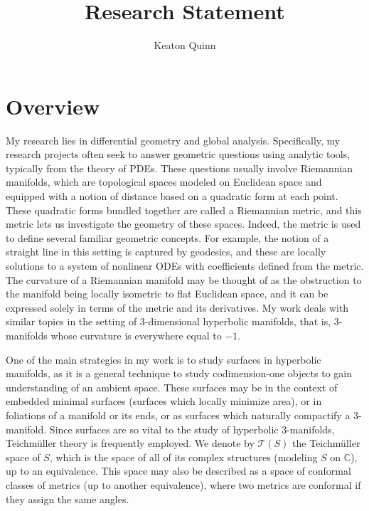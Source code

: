 \documentclass[11pt]{amsart}
\newcommand{\C}{\mathbb{C}}
\begin{document}
\title{Research Statement}

\author{Keaton Quinn}


\maketitle

\vspace{-0.2in}

\section{Overview}

My research lies in differential geometry and global analysis. 
Specifically, my research projects often seek to answer geometric questions using analytic tools, typically from the theory of PDEs. 
These questions usually involve Riemannian manifolds, which are topological spaces modeled on Euclidean space and equipped with a notion of distance based on a quadratic form at each point. 
These quadratic forms bundled together are called a Riemannian metric, and this metric lets us investigate the geometry of these spaces.  
Indeed, the metric is used to define several familiar geometric concepts. 
For example, the notion of a straight line in this setting is captured by geodesics, and these are locally solutions to a system of nonlinear ODEs with coefficients defined from the metric. 
The curvature of a Riemannian manifold may be thought of as the obstruction to the manifold being locally isometric to flat Euclidean space, and it can be expressed solely in terms of the metric and its derivatives.  
My work deals with similar topics in the setting of 3-dimensional hyperbolic manifolds, that is, 3-manifolds whose curvature is everywhere equal to $-1$.


One of the main strategies in my work is to study surfaces in hyperbolic manifolds, as it is a general technique to study codimension-one objects to gain understanding of an ambient space. 
These surfaces may be in the context of embedded minimal surfaces (surfaces which locally minimize area), or in foliations of a manifold or its ends, or as surfaces which naturally compactify a 3-manifold. 
Since surfaces are so vital to the study of hyperbolic 3-manifolds, Teichm\"uller theory is frequently employed. 
We denote by $\mathcal{T}(S)$ the Teichm\"uller space of $S$, which is the space of all of its complex structures (modeling $S$ on $\C$), up to an equivalence. 
This space may also be described as a space of conformal classes of metrics (up to another equivalence), where two metrics are conformal if they assign the same angles.
\end{document}
